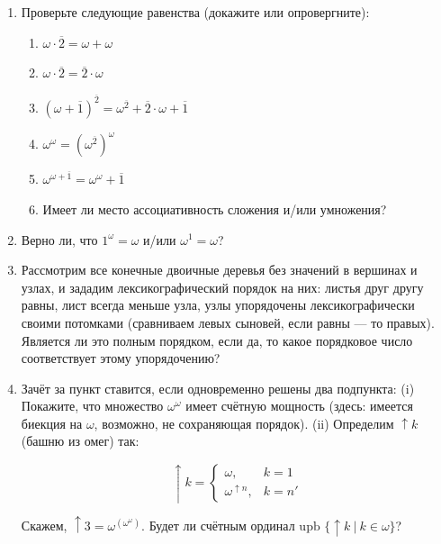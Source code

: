 \documentclass[10pt,a4paper,oneside]{article}
\begin{document}
\begin{enumerate}
\begin{enumerate}
\item (\emph{указание к следующему пункту}) покажите, что если $\vdash\forall x.\neg\phi(x)\rightarrow A\with\neg A$, то $\vdash\forall x.\phi(x)$.
\item Если $\phi(\varnothing)$ и $\forall x.x \in \omega \rightarrow \phi(x) \rightarrow \phi(x')$, 
то $\forall x.x \in \omega \rightarrow \phi(x)$.
\end{enumerate}
\item Проверьте следующие равенства (докажите или опровергните):
\begin{enumerate}
\item $\omega\cdot\overline{2} = \omega + \omega$
\item $\omega\cdot\overline{2} = \overline{2}\cdot\omega$
\item $(\omega+\overline{1})^{\overline{2}} = \omega^{\overline{2}} + \overline{2}\cdot \omega + \overline{1}$
\item $\omega ^ \omega = (\omega ^ {\overline{2}}) ^ \omega$
\item $\omega ^ {\omega + \overline{1}} = \omega ^ \omega + \overline{1}$
\item Имеет ли место ассоциативность сложения и/или умножения?
\end{enumerate}
\item Верно ли, что $1^\omega = \omega$ и/или $\omega^1 = \omega$?
\item Рассмотрим все конечные двоичные деревья без значений в вершинах и узлах, и зададим лексикографический порядок на них:
листья друг другу равны, лист всегда меньше узла, узлы упорядочены лексикографически своими потомками 
(сравниваем левых сыновей, если равны --- то правых). Является ли это полным порядком, если да, то какое порядковое число 
соответствует этому упорядочению?
\item Зачёт за пункт ставится, если одновременно решены два подпункта:
(i) Покажите, что множество $\omega^\omega$ имеет счётную мощность (здесь: имеется биекция на $\omega$, возможно, не 
сохраняющая порядок). 
(ii) Определим $\uparrow k$ (башню из омег) так:

$$\uparrow k = \left\{\begin{array}{ll}\omega,&k = 1\\\omega^{\uparrow n},&k = n'\end{array}\right.$$

Скажем, $\uparrow 3 = \omega^{\left(\omega^\omega\right)}$. Будет ли счётным ординал $\text{upb }\{\uparrow k\ |\ k \in \omega\}$?


\end{enumerate}
\end{document}
